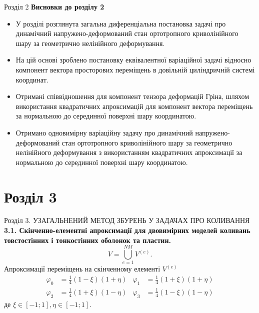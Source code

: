 \documentclass[8pt]{beamer}
\numberwithin{figure}{section}
\numberwithin{equation}{section}
\numberwithin{table}{section}
\begin{document}
\begin{frame}{Розділ 2}
\textbf{Висновки до розділу 2}\\
\vspace{1em}
\begin{itemize}
\item У розділі розглянута загальна диференціальна постановка задачі про динамічний напружено-деформований стан ортотропного криволінійного шару за геометрично нелінійного деформування.
\item На цій основі зроблено постановку еквівалентної варіаційної задачі відносно компонент вектора просторових переміщень в довільній циліндричній системі координат.
\item Отримані співвідношення для компонент тензора деформацій Гріна, шляхом використання квадратичних апроксимацій для компонент вектора переміщень за нормальною до серединної поверхні шару координатою.
\item Отримано одновимірну варіаційну задачу про динамічний напружено-деформований стан ортотропного криволінійного шару за геометрично нелінійного деформування з використанням квадратичних апроксимації за нормальною до серединної поверхні шару координатою. 
\end{itemize}

\end{frame}

\section{Розділ 3}
\begin{frame}{Розділ 3. УЗАГАЛЬНЕНИЙ МЕТОД ЗБУРЕНЬ У ЗАДАЧАХ ПРО КОЛИВАННЯ}
\textbf{3.1. Скінченно-елементні апроксимації для двовимірних моделей коливань товстостінних і тонкостінних оболонок та пластин.}
\\
\vspace{1em}
\begin{equation}
V=\bigcup\limits_{e=1}^{NM} V^{(e)}.
\end{equation}
Апроксимації переміщень на скінченному елементі $V^{(e)}$
\begin{equation}
\begin{aligned}
\varphi_0&=\frac{1}{4}\left(1-\xi\right)\left(1+\eta\right) & \varphi_1 &=\frac{1}{4}\left(1+\xi\right)\left(1+\eta\right)\\
\varphi_2&=\frac{1}{4}\left(1+\xi\right)\left(1-\eta\right) & \varphi_3 &=\frac{1}{4}\left(1-\xi\right)\left(1-\eta\right)
\end{aligned}
\end{equation}
де $\xi \in [-1;1], \eta \in [-1;1]$.

\end{frame}
\end{document}
